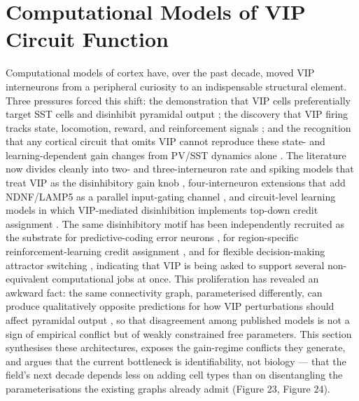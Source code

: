 \documentclass[11pt]{article}
\begin{document}
\section{Computational Models of VIP Circuit Function}
\label{sec:12_computational_models}

Computational models of cortex have, over the past decade, moved VIP interneurons from a peripheral curiosity to an indispensable structural element. Three pressures forced this shift: the demonstration that VIP cells preferentially target SST cells and disinhibit pyramidal output \citep{Pi2013, Pfeffer2013, Lee2013}; the discovery that VIP firing tracks state, locomotion, reward, and reinforcement signals \citep{Fu2014, Pakan2016, Krabbe2019, Dipoppa2018}; and the recognition that any cortical circuit that omits VIP cannot reproduce these state- and learning-dependent gain changes from PV/SST dynamics alone \citep{Garciadelmolino2017, Litwinkumar2016, Hertag2019}. The literature now divides cleanly into two- and three-interneuron rate and spiking models that treat VIP as the disinhibitory gain knob \citep{Hertag2019, Litwinkumar2016, Garciadelmolino2017, Bos2025, Veit2023}, four-interneuron extensions that add NDNF/LAMP5 as a parallel input-gating channel \citep{Iqbal2025, Hartung2024, Anastasiades2021a}, and circuit-level learning models in which VIP-mediated disinhibition implements top-down credit assignment \citep{Hertag2019, Lee2025}. The same disinhibitory motif has been independently recruited as the substrate for predictive-coding error neurons \citep{Hertag2020, Hertag2021, Rossbroich2025, Nemati2025a, Nemati2025b, Shipp2016}, for region-specific reinforcement-learning credit assignment \citep{Chevy2024}, and for flexible decision-making attractor switching \citep{Shen2023, Yang2016}, indicating that VIP is being asked to support several non-equivalent computational jobs at once. This proliferation has revealed an awkward fact: the same connectivity graph, parameterised differently, can produce qualitatively opposite predictions for how VIP perturbations should affect pyramidal output \citep{Hertag2019, Tahvili2025a, Tahvili2025b, Garciadelmolino2017}, so that disagreement among published models is not a sign of empirical conflict but of weakly constrained free parameters. This section synthesises these architectures, exposes the gain-regime conflicts they generate, and argues that the current bottleneck is identifiability, not biology --- that the field's next decade depends less on adding cell types than on disentangling the parameterisations the existing graphs already admit (Figure 23, Figure 24).
\end{document}
